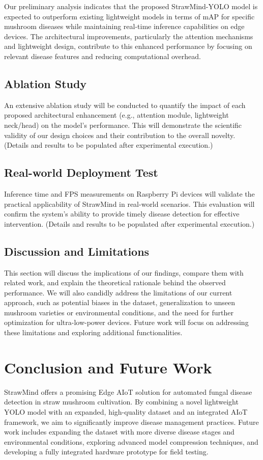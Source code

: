 \documentclass[journal]{IEEEtran}
\begin{document}
Our preliminary analysis indicates that the proposed StrawMind-YOLO model is expected to outperform existing lightweight models in terms of mAP for specific mushroom diseases while maintaining real-time inference capabilities on edge devices. The architectural improvements, particularly the attention mechanisms and lightweight design, contribute to this enhanced performance by focusing on relevant disease features and reducing computational overhead.

\subsection{Ablation Study}
An extensive ablation study will be conducted to quantify the impact of each proposed architectural enhancement (e.g., attention module, lightweight neck/head) on the model's performance. This will demonstrate the scientific validity of our design choices and their contribution to the overall novelty. (Details and results to be populated after experimental execution.)

\subsection{Real-world Deployment Test}
Inference time and FPS measurements on Raspberry Pi devices will validate the practical applicability of StrawMind in real-world scenarios. This evaluation will confirm the system's ability to provide timely disease detection for effective intervention. (Details and results to be populated after experimental execution.)

\subsection{Discussion and Limitations}
This section will discuss the implications of our findings, compare them with related work, and explain the theoretical rationale behind the observed performance. We will also candidly address the limitations of our current approach, such as potential biases in the dataset, generalization to unseen mushroom varieties or environmental conditions, and the need for further optimization for ultra-low-power devices. Future work will focus on addressing these limitations and exploring additional functionalities.

\section{Conclusion and Future Work}
StrawMind offers a promising Edge AIoT solution for automated fungal disease detection in straw mushroom cultivation. By combining a novel lightweight YOLO model with an expanded, high-quality dataset and an integrated AIoT framework, we aim to significantly improve disease management practices. Future work includes expanding the dataset with more diverse disease stages and environmental conditions, exploring advanced model compression techniques, and developing a fully integrated hardware prototype for field testing.




\vfill
\end{document}
